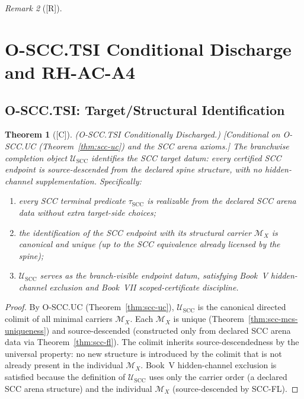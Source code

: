 \documentclass[12pt,oneside]{amsbook}
\theoremstyle{plain}
\newtheorem{theorem}{Theorem}[section]
\theoremstyle{definition}
\theoremstyle{remark}
\newtheorem{remark}[theorem]{Remark}
\newcommand{\status}[1]{\textup{[#1]}}
\begin{document}
\begin{remark}[\status{R}]
\section{O-SCC.TSI Conditional Discharge and RH-AC-A4}
\label{sec:tsi-a4}

\subsection{O-SCC.TSI: Target/Structural Identification}

\begin{theorem}[\status{C}]\label{thm:scc-tsi}
\textup{(O-SCC.TSI Conditionally Discharged.)}
\textup{[Conditional on O-SCC.UC (Theorem~\ref{thm:scc-uc}) and
the SCC arena axioms.]}
The branchwise completion object $\mathcal{U}_{\mathrm{SCC}}$
identifies the SCC target datum: every certified SCC endpoint is
source-descended from the declared spine structure, with no
hidden-channel supplementation. Specifically:
\begin{enumerate}[label=\textup{(\arabic*)}]
 \item every SCC terminal predicate $\tau_{\mathrm{SCC}}$ is
 realizable from the declared SCC arena data without extra
 target-side choices;
 \item the identification of the SCC endpoint with its structural
 carrier $\mathcal{M}_X$ is canonical and unique (up to the
 SCC equivalence already licensed by the spine);
 \item $\mathcal{U}_{\mathrm{SCC}}$ serves as the branch-visible
 endpoint datum, satisfying Book~V hidden-channel exclusion and
 Book~VII scoped-certificate discipline.
\end{enumerate}
\end{theorem}

\begin{proof}
By O-SCC.UC (Theorem~\ref{thm:scc-uc}), $\mathcal{U}_{\mathrm{SCC}}$
is the canonical directed colimit of all minimal carriers
$\mathcal{M}_X$. Each $\mathcal{M}_X$ is unique
(Theorem~\ref{thm:scc-mcs-uniqueness}) and source-descended
(constructed only from declared SCC arena data via
Theorem~\ref{thm:scc-fl}). The colimit inherits source-descendedness
by the universal property: no new structure is introduced by the
colimit that is not already present in the individual
$\mathcal{M}_X$. Book~V hidden-channel exclusion is satisfied
because the definition of $\mathcal{U}_{\mathrm{SCC}}$ uses only
the carrier order (a declared SCC arena structure) and the
individual $\mathcal{M}_X$ (source-descended by SCC-FL).


\end{proof}
\end{remark}
\end{document}
